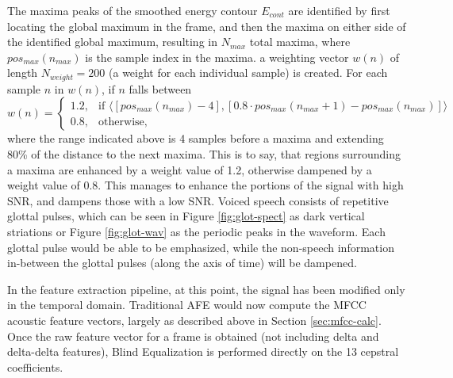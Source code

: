The maxima peaks of the smoothed energy contour $E_{cont}$ are identified by first locating the global maximum in the frame, and then the maxima on either side of the identified global maximum, resulting in $N_{max}$ total maxima, where $pos_{max}(n_{max})$ is the sample index in the maxima. a weighting vector $w(n)$ of length $N_{weight}=200$ (a weight for each individual sample) is created.  For each sample $n$ in $w(n)$, if $n$ falls between 
\[ w(n)= \begin{cases} 1.2,& \text{if } \langle [pos_{max}(n_{max})-4], [0.8 \cdot pos_{max}(n_{max}+1)-pos_{max}(n_{max})] \rangle \\ 0.8,& \text{otherwise,} \end{cases}  \]
where the range indicated above is 4 samples before a maxima and extending 80\% of the distance to the next maxima. 
This is to say, that regions surrounding a maxima are enhanced by a weight value of 1.2, otherwise dampened by a weight value of 0.8.  This manages to enhance the portions of the signal with high SNR, and dampens those with a low SNR.  Voiced speech consists of repetitive glottal pulses, which can be seen in Figure \ref{fig:glot-spect} as dark vertical striations or Figure \ref{fig:glot-wav} as the periodic peaks in the waveform.  Each glottal pulse would be able to be emphasized, while the non-speech information in-between the glottal pulses (along the axis of time) will be dampened.

In the feature extraction pipeline, at this point, the signal has been modified only in the temporal domain.  Traditional AFE would now compute the MFCC acoustic feature vectors, largely as described above in Section \ref{sec:mfcc-calc}.  Once the raw feature vector for a frame is obtained (not including delta and delta-delta features), Blind Equalization is performed directly on the 13 cepstral coefficients.

